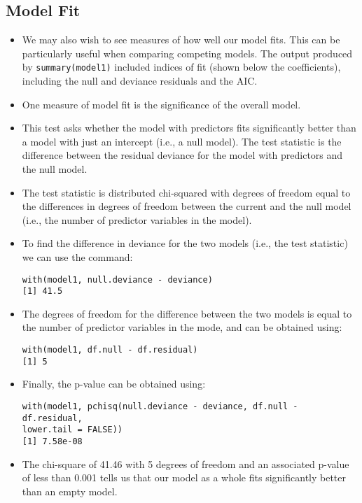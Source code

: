 \documentclass[]{article}
\begin{document}
\subsection{Model Fit}
\begin{itemize}
\item We may also wish to see measures of how well our model fits. This can be particularly useful when comparing competing models. The output produced by \texttt{summary(model1)} included indices of fit (shown below the coefficients), including the null and deviance residuals and the AIC. 
\item One measure of model fit is the significance of the overall model. 
\item This test asks whether the model with predictors fits significantly better than a model with just an intercept (i.e., a null model). The test statistic is the difference between the residual deviance for the model with predictors and the null model. 
\item The test statistic is distributed chi-squared with degrees of freedom equal to the differences in degrees of freedom between the current and the null model (i.e., the number of predictor variables in the model). 
\item To find the difference in deviance for the two models (i.e., the test statistic) we can use the command:

\begin{framed}
\begin{verbatim}
with(model1, null.deviance - deviance)
[1] 41.5
\end{verbatim}
\end{framed}
\item The degrees of freedom for the difference between the two models is equal to the number of predictor variables in the mode, and can be obtained using:
\begin{framed}
\begin{verbatim}
with(model1, df.null - df.residual)
[1] 5
\end{verbatim}
\end{framed}
\item Finally, the p-value can be obtained using:
\begin{framed}
\begin{verbatim}
with(model1, pchisq(null.deviance - deviance, df.null - df.residual, 
lower.tail = FALSE))
[1] 7.58e-08
\end{verbatim}
\end{framed}


\item The chi-square of 41.46 with 5 degrees of freedom and an associated p-value of less than 0.001 tells us that our model as a whole fits significantly better than an empty model. 
\end{itemize}
\end{document}
